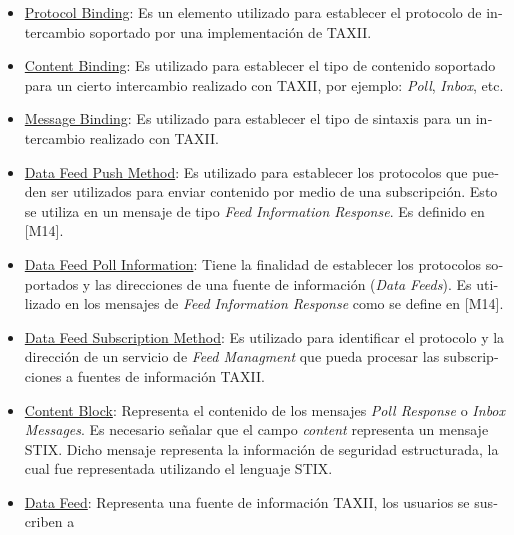 	
	\begin{itemize}
		\item \foreignlanguage{spanish}{\underline{Protocol Binding}: Es un elemento utilizado para establecer el protocolo de intercambio
			soportado por una implementación de TAXII.}
		\item \foreignlanguage{spanish}{\underline{Content Binding}: Es utilizado para establecer el tipo de contenido soportado para un
			cierto intercambio realizado con TAXII, por ejemplo:
		}\foreignlanguage{spanish}{\textit{Poll}}\foreignlanguage{spanish}{,
	}\foreignlanguage{spanish}{\textit{Inbox}}\foreignlanguage{spanish}{, etc.}
	\item \foreignlanguage{spanish}{\underline{Message Binding}: Es utilizado para establecer el tipo de sintaxis para un intercambio
		realizado con TAXII.}
	\item \foreignlanguage{spanish}{\underline{Data Feed Push Method}: Es utilizado para establecer los protocolos que pueden ser
		utilizados para enviar contenido por medio de una subscripción. Esto se utiliza en un mensaje de tipo
	}\foreignlanguage{spanish}{\textit{Feed Information Response}}\foreignlanguage{spanish}{. Es definido en [M14].}
	\item \foreignlanguage{spanish}{\underline{Data Feed Poll Information}: Tiene la finalidad de establecer los protocolos soportados y
		las direcciones de una fuente de información (}\foreignlanguage{spanish}{\textit{Data
			Feeds}}\foreignlanguage{spanish}{). Es utilizado en los mensajes de }\foreignlanguage{spanish}{\textit{Feed Information
			Response}}\foreignlanguage{spanish}{ como se define en [M14].}
	\item \foreignlanguage{spanish}{\underline{Data Feed Subscription Method}: Es utilizado para identificar el protocolo y la dirección
		de un servicio de }\foreignlanguage{spanish}{\textit{Feed Managment}}\foreignlanguage{spanish}{ que pueda procesar las
		subscripciones a fuentes de información TAXII.}
	\item \foreignlanguage{spanish}{\underline{Content Block}: Representa el contenido de los mensajes
	}\foreignlanguage{spanish}{\textit{Poll Response }}\foreignlanguage{spanish}{o }\foreignlanguage{spanish}{\textit{Inbox
		Messages}}\foreignlanguage{spanish}{. Es necesario señalar que el campo
}\foreignlanguage{spanish}{\textit{content}}\foreignlanguage{spanish}{ representa un mensaje STIX. Dicho mensaje
representa la información de seguridad estructurada, la cual fue representada utilizando el lenguaje STIX.}
\item \foreignlanguage{spanish}{\underline{Data Feed}: Representa una fuente de información TAXII, los usuarios se suscriben a
}
\end{itemize}
